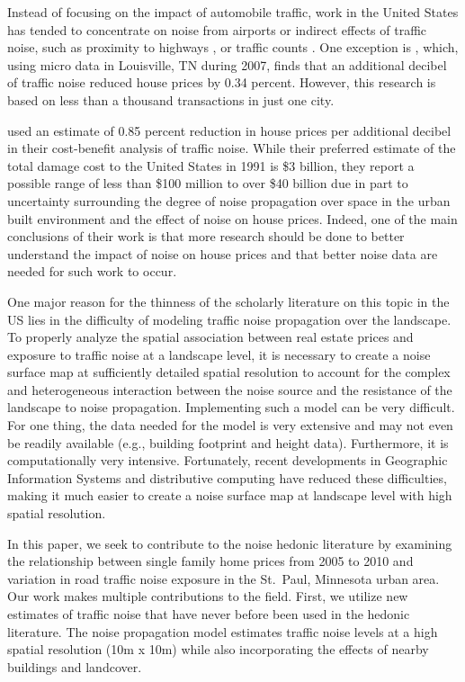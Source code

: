 \documentclass{article}\usepackage{graphicx, color}
\begin{document}
Instead of focusing on the impact of automobile traffic, work in the United States has tended to concentrate on noise from airports \citep{Espey2000, McMillen2004, Cohen2008a} or indirect effects of traffic noise, such as proximity to highways \citep{Matthews2007, Chernobai2009, Li2012}, or traffic counts \citep{HughesJr.1992, Larsen2012}. One exception is \citet{Cheng2008}, which, using micro data in Louisville, TN during 2007, finds that an additional decibel of traffic noise reduced house prices by 0.34 percent. However, this research is based on less than a thousand transactions in just one city.

\citet{Delucchi1998} used an estimate of 0.85 percent reduction in house prices per additional decibel in their cost-benefit analysis of traffic noise. While their preferred estimate of the total damage cost to the United States in 1991 is \$3 billion, they report a possible range of less than \$100 million to over \$40 billion due in part to uncertainty surrounding the degree of noise propagation over space in the urban built environment and the effect of noise on house prices. Indeed, one of the main conclusions of their work is that more research should be done to better understand the impact of noise on house prices and that better noise data are needed for such work to occur. 

One major reason for the thinness of the scholarly literature on this topic in the US lies in the difficulty of modeling traffic noise propagation over the landscape. To properly analyze the spatial association between real estate prices and exposure to traffic noise at a landscape level, it is necessary to create a noise surface map at sufficiently detailed spatial resolution to account for the complex and heterogeneous interaction between the noise source and the resistance of the landscape to noise propagation.  Implementing such a model can be very difficult.  For one thing, the data needed for the model is very extensive and may not even be readily available (e.g., building footprint and height data).  Furthermore, it is computationally very intensive. Fortunately, recent developments in Geographic Information Systems and distributive computing have reduced these difficulties, making it much easier to create a noise surface map at landscape level with high spatial resolution.  

In this paper, we seek to contribute to the noise hedonic literature by examining the relationship between single family home prices from 2005 to 2010 and variation in road traffic noise exposure in the St.\ Paul, Minnesota urban area. Our work makes multiple contributions to the field. First, we utilize new estimates of traffic noise that have never before been used in the hedonic literature. The noise propagation model estimates traffic noise levels at a high spatial resolution (10m x 10m) while also incorporating the effects of nearby buildings and landcover. 
\end{document}
